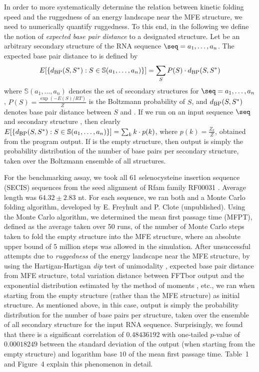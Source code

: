 In order to more systematically determine the relation between kinetic
folding speed and the ruggedness of an energy landscape near the MFE structure,
we need to numerically quantify ruggedness. To this end, in the following
we define the notion of {\em expected base pair distance} to a designated
structure. Let \strSt be an arbitrary secondary structure of the RNA sequence
$\seq = a_1,\dots,a_n$.
The expected base pair distance to \strSt is defined by
\begin{eqnarray}
\label{eq:expectedBasePairDist}
E[ \{ d_{\mbox{\sc bp}}(S,S^*): S \in \mathbb{S}(a_1,\ldots,a_n)\} ]  =
\sum_{S} P(S) \cdot d_{\mbox{\sc bp}}(S,S^*)
\end{eqnarray}
where
$\mathbb{S}(a_1,\ldots,a_n)$ denotes the set of secondary structures for
$\seq = a_1,\dots,a_n$, $P(S) = \frac{\exp(-E(S)/RT)}{Z}$ is the Boltzmann
probability of $S$, and
$d_{\mbox{\sc bp}}(S,S^*)$ denotes base pair distance between $S$ and \strSt.
If we run \fftbor on an input sequence $\seq$ and secondary structure
\strSt, then clearly
$E[ \{ d_{\mbox{\sc bp}}(S,S^*): S \in \mathbb{S}(a_1,\ldots,a_n)\} ]  =
\sum_{k} k \cdot p(k)$, where $p(k)=\frac{Z_k}{Z}$, obtained from the
program output.  If \strSt is the empty structure, then \fftbor output
is simply the probability distribution of the number of base pairs per
secondary structure, taken over the Boltzmann ensemble of all structures.

For the benchmarking assay, we took all 61 selenocysteine insertion sequence
(SECIS) sequences from the seed alignment of Rfam family RF00031
\cite{Gardner.nar11}. Average length was $64.32 \pm 2.83$ nt.
For each sequence, we ran both \fftbor and a Monte Carlo
folding algorithm, developed by E. Freyhult and P. Clote (unpublished).
Using the Monte Carlo algorithm, we
determined the mean first passage time (MFPT), defined as the average
taken over 50 runs, of the number of Monte Carlo steps taken to fold
the empty structure into the MFE structure, where an absolute upper bound
of 5 million steps was allowed in the simulation.  After unsuccessful
attempts due to {\em ruggedness} of the energy landscape near the MFE structure,
by using the Hartigan-Hartigan {\em dip} test of unimodality
\cite{hartiganDipTest},
expected base pair distance from MFE structure, total variation distance
between FFTbor output and the exponential distribution estimated by
the method of moments \cite{zar:biostatistics}, etc.,
we ran \fftbor
when starting from the empty structure (rather than the MFE structure)
as initial structure.
As mentioned above, in this case, \fftbor output is simply
the probability distribution
for the number of base pairs per structure, taken over the ensemble
of all secondary structure for the input RNA
sequence. Surprisingly, we found that there is a significant
correlation of  $0.48436192$ with one-tailed
$p$-value of $0.00018249$ between the
standard deviation of the \fftbor output (when starting from the
empty structure) and logarithm base $10$ of the mean first passage time.
Table~1 and Figure~4 explain this phenomenon in detail.

